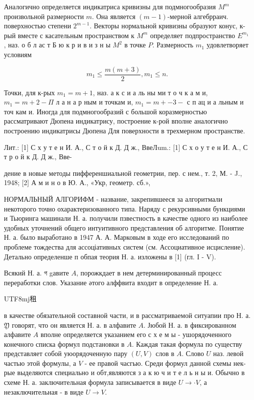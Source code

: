 \documentclass[10pt]{article}
\begin{document}
Аналогично определяется индикатриса кривизны для подмногообразия $M^{m}$ произвольной размерности $m$. Она является $(m-1)$-мерной алгебрраич. поверхностью степени $2^{m-1}$. Векторы нормальной кривизны образуют конус, к-рый вместе с касательным пространством к $M^{m}$ определяет подпространство $E^{m_{1}}$, наз. о б л ас т Б ю к р и в и з н ы $M^{2}$ в точке $P$. Размерность $m_{1}$ удовлетворяет условиям



\[

m_{1} \leqslant \frac{m(m+3)}{2}, m_{1} \leqslant n .

\]



Точки, для к-рых $m_{1}=m+1$, наз. а к с и а ль ны ми т о ч к а м и, $m_{1}=m+2-\Pi$ л а н а р ным и точкам и, $m_{1}=m+-3-$ с п ац и а льным и точ кам и. Иногда для подмногообразий с большой коразмерностью рассматривают Дюпена индикатрису, построение к-рой вполне аналогично построению индикатрисы Дюпена Для поверхности в трехмерном пространстве.

Лит.: [1] С х у т е н И. А., С т о й к Д. Д ж., ВвеЛum.: [1] С х о у т е н И. А., С т р о й к Д. Д ж., Вве-

дение в новые методы пифференшиальной геометрии, пер. с нем., т. 2, М. - J., 1948; [2] А м и н о в Ю. А., «Укр, геометр. сб.»,



НОРМАЛЬНЫЙ АЛГОРИФМ - название, закрепившееся за алгоритмали некоторого точно охарактеризованного типа. Наряду с рекурсивными бункциями и Тьюринга машинали Н. а. получили пзвестность в качестве одного из наиболее удобных уточнений общего интуитивного представления об алгоритме. Понятие Н. а. было выработано в 1947 А. А. Марковым в ходе его исследований по проблеме тождества для ассоціативных систем (см. Ассоциативное исцисление). Детально определенше п обпая теория Н. а. изложены в [1] (гл. I - V).



Всякий Н. а. গ gавите $A$, порожкдает в нем детерминированный процесс переработки слов. Указание әтого алффвита входит в определение Н. а. \begin{CJK}{UTF8}{mj}租\end{CJK} в качестве обязательной составной части, и в рассматриваемой ситуапии про Н. а. $\mathfrak{Y}$ говорят, что он является Н. а. в алфавите $A$. Јюбой Н. а. в фиксированном алфавите $A$ вполне определяется указанием его с х е м ы - ушорядоченного конечного списка формул подстановки в $A$. Каждая такая формула по существу представляет собой уюорядоченную пару $(U, V)$ слов в $A$. Слово $U$ наз. левой частью этой формулы, а $V$ - ее правой часгью. Среди формул данной схемы нек-рые выделяются специально и обт,являются з а к ю ч и т е л ь н ы и. Обычно в схеме Н. а. заключительная формула записывается в виде $U \rightarrow \cdot V$, а незаключительная - в виде $U \rightarrow V$.
\end{document}
